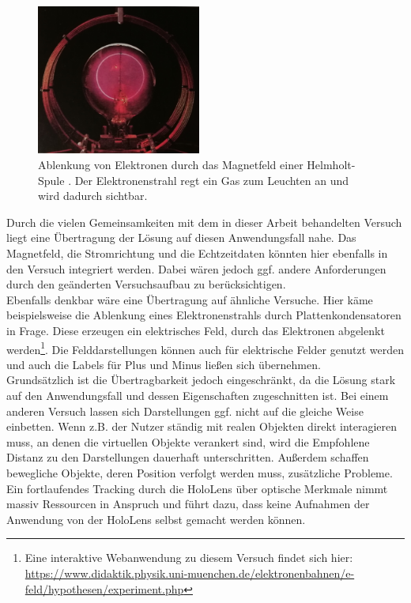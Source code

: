 \begin{figure}
	\centering
	\includegraphics[width=0.48\textwidth]{images/papers/beam.jpg}
	\caption{Ablenkung von Elektronen durch das Magnetfeld einer Helmholt-Spule \cite{Bader15}. Der Elektronenstrahl regt ein Gas zum Leuchten an und wird dadurch sichtbar.}
	\label{img:beam}
\end{figure}

Durch die vielen Gemeinsamkeiten mit dem in dieser Arbeit behandelten Versuch liegt eine Übertragung der Lösung auf diesen Anwendungsfall nahe. Das Magnetfeld, die Stromrichtung und die Echtzeitdaten könnten hier ebenfalls in den Versuch integriert werden. Dabei wären jedoch ggf. andere Anforderungen durch den geänderten Versuchsaufbau zu berücksichtigen.\\

Ebenfalls denkbar wäre eine Übertragung auf ähnliche Versuche. Hier käme beispielsweise die Ablenkung eines Elektronenstrahls durch Plattenkondensatoren in Frage. Diese erzeugen ein elektrisches Feld, durch das Elektronen abgelenkt werden\footnote{Eine interaktive Webanwendung zu diesem Versuch findet sich hier: \url{https://www.didaktik.physik.uni-muenchen.de/elektronenbahnen/e-feld/hypothesen/experiment.php}}. Die Felddarstellungen können auch für elektrische Felder genutzt werden und auch die Labels für Plus und Minus ließen sich übernehmen.\\

Grundsätzlich ist die Übertragbarkeit jedoch eingeschränkt, da die Lösung stark auf den Anwendungsfall und dessen Eigenschaften zugeschnitten ist. Bei einem anderen Versuch lassen sich Darstellungen ggf. nicht auf die gleiche Weise einbetten. Wenn z.B. der Nutzer ständig mit realen Objekten direkt interagieren muss, an denen die virtuellen Objekte verankert sind, wird die Empfohlene Distanz zu den Darstellungen dauerhaft unterschritten. Außerdem schaffen bewegliche Objekte, deren Position verfolgt werden muss, zusätzliche Probleme. Ein fortlaufendes Tracking durch die HoloLens über optische Merkmale nimmt massiv Ressourcen in Anspruch und führt dazu, dass keine Aufnahmen der Anwendung von der HoloLens selbst gemacht werden können.\\

